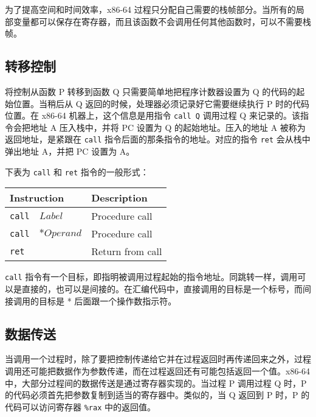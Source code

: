 为了提高空间和时间效率，x86-64 过程只分配自己需要的栈帧部分。当所有的局部变量都可以保存在寄存器，而且该函数不会调用任何其他函数时，可以不需要栈帧。

\subsection{转移控制}

将控制从函数 P 转移到函数 Q 只需要简单地把程序计数器设置为 Q 的代码的起始位置。当稍后从 Q 返回的时候，处理器必须记录好它需要继续执行 P 时的代码位置。在 x86-64 机器上，这个信息是用指令 \verb|call Q| 调用过程 Q 来记录的。该指令会把地址 A 压入栈中，并将 PC 设置为 Q 的起始地址。压入的地址 A 被称为返回地址，是紧跟在 \verb|call| 指令后面的那条指令的地址。对应的指令 \verb|ret| 会从栈中弹出地址 A，并把 PC 设置为 A。

下表为 \verb|call| 和 \verb|ret| 指令的一般形式：
\begin{table}[!ht]
    \centering
    \begin{tabular}{lll}
        \toprule
        \multicolumn{2}{l}{Instruction} & Description \\
        \midrule
        \texttt{call} & $Label$    & Procedure call \\
        \texttt{call} & $*Operand$ & Procedure call \\
        \texttt{ret}  &            & Return from call \\
        \bottomrule
    \end{tabular}
\end{table}

\verb|call| 指令有一个目标，即指明被调用过程起始的指令地址。同跳转一样，调用可以是直接的，也可以是间接的。在汇编代码中，直接调用的目标是一个标号，而间接调用的目标是 * 后面跟一个操作数指示符。

\subsection{数据传送}

当调用一个过程时，除了要把控制传递给它并在过程返回时再传递回来之外，过程调用还可能把数据作为参数传递，而在过程返回还有可能包括返回一个值。x86-64 中，大部分过程间的数据传送是通过寄存器实现的。当过程 P 调用过程 Q 时，P 的代码必须首先把参数复制到适当的寄存器中。类似的，当 Q 返回到 P 时，P 的代码可以访问寄存器 \verb|%rax| 中的返回值。

